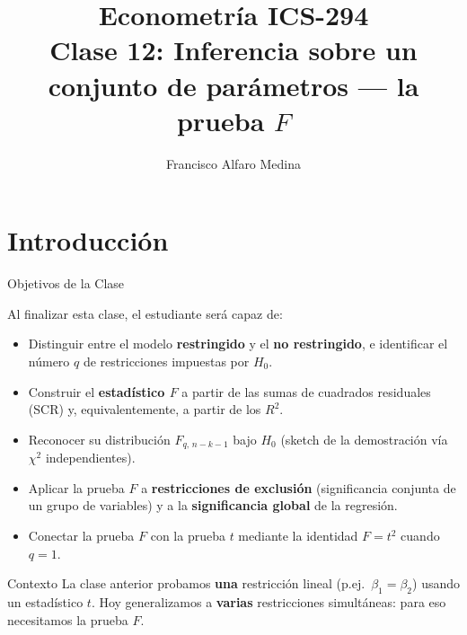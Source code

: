 \documentclass{beamer}
\title[ICS-294]{Econometría ICS-294\\ \small{Clase 12: Inferencia sobre un conjunto de parámetros — la prueba $F$}}
\author{Francisco Alfaro Medina}
\institute[USM]
{Universidad Técnica Federico Santa María\\ %
	\medskip
	\textit{francisco.alfaro@usm.cl} %

}
\date{}
\begin{document}
\begin{frame}
	\titlepage %


\end{frame}
\logo{}

\section{Introducción}

\begin{frame}{Objetivos de la Clase}

Al finalizar esta clase, el estudiante será capaz de:

\begin{itemize}
    \item[\checkmark] Distinguir entre el modelo \textbf{restringido} y el \textbf{no restringido}, e identificar el número $q$ de restricciones impuestas por $H_0$.
    \item[\checkmark] Construir el \textbf{estadístico $F$} a partir de las sumas de cuadrados residuales (SCR) y, equivalentemente, a partir de los $R^2$.
    \item[\checkmark] Reconocer su distribución $F_{q,\,n-k-1}$ bajo $H_0$ (sketch de la demostración vía $\chi^2$ independientes).
    \item[\checkmark] Aplicar la prueba $F$ a \textbf{restricciones de exclusión} (significancia conjunta de un grupo de variables) y a la \textbf{significancia global} de la regresión.
    \item[\checkmark] Conectar la prueba $F$ con la prueba $t$ mediante la identidad $F = t^2$ cuando $q=1$.
\end{itemize}

\vspace{0.2cm}
\begin{alertblock}{Contexto}
La clase anterior probamos \textbf{una} restricción lineal (p.ej.\ $\beta_1=\beta_2$) usando un estadístico $t$. Hoy generalizamos a \textbf{varias} restricciones simultáneas: para eso necesitamos la prueba $F$.
\end{alertblock}

\end{frame}
\end{document}
